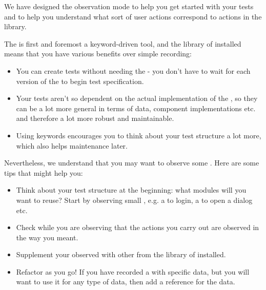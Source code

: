 
We have designed the observation mode to help you get started with your tests and to help you understand what sort of user actions correspond to  actions in the library. 

The \ite{} is first and foremost a keyword-driven tool, and the library of \gdcases{} installed means that you have various benefits over simple recording:

\begin{itemize}
\item You can create tests without needing the \gdaut{} - you don't have to wait for each version of the \gdaut{} to begin test specification. 
\item Your tests aren't so dependent on the actual implementation of the \gdaut{}, so they can be a lot more general in terms of data, component implementations etc. and therefore a lot more robust and maintainable. 
\item Using keywords encourages you to think about your test structure a lot more, which also helps maintenance later. 

\end{itemize}


Nevertheless, we understand that you may want to observe some \gdcases{}. Here are some tips that might help you:
\begin{itemize}
\item Think about your test structure at the beginning: what modules will you want to reuse? Start by observing small \gdcases{}, e.g. a \gdcase{} to login, a \gdcase{} to open a dialog etc. 
\item Check while you are observing that the actions you carry out are observed in the way you meant. 
\item Supplement your observed \gdcases{} with other \gdcases{} from the library of \gdcases{} installed. 
\item Refactor as you go! If you have recorded a \gdcase{} with specific data, but you will want to use it for any type of data, then add a reference for the data. 
\end{itemize}
